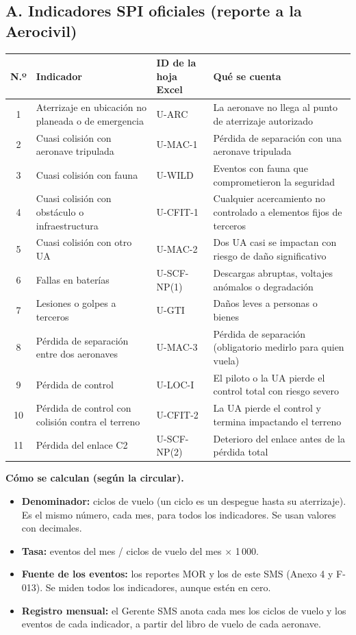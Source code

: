 \subsection*{A. Indicadores SPI oficiales (reporte a la Aerocivil)}
\begin{longtable}{|c|>{\RaggedRight\arraybackslash}p{4.4cm}|>{\RaggedRight\arraybackslash}p{2.4cm}|>{\RaggedRight\arraybackslash}p{5.6cm}|}
\hline
\rowcolor[gray]{0.9}\textbf{N.º} & \textbf{Indicador} & \textbf{ID de la hoja Excel} & \textbf{Qué se cuenta} \\ \hline
\endhead
1 & Aterrizaje en ubicación no planeada o de emergencia & U-ARC & La aeronave no llega al punto de aterrizaje autorizado \\ \hline
2 & Cuasi colisión con aeronave tripulada & U-MAC-1 & Pérdida de separación con una aeronave tripulada \\ \hline
3 & Cuasi colisión con fauna & U-WILD & Eventos con fauna que comprometieron la seguridad \\ \hline
4 & Cuasi colisión con obstáculo o infraestructura & U-CFIT-1 & Cualquier acercamiento no controlado a elementos fijos de terceros \\ \hline
5 & Cuasi colisión con otro UA & U-MAC-2 & Dos UA casi se impactan con riesgo de daño significativo \\ \hline
6 & Fallas en baterías & U-SCF-NP(1) & Descargas abruptas, voltajes anómalos o degradación \\ \hline
7 & Lesiones o golpes a terceros & U-GTI & Daños leves a personas o bienes \\ \hline
8 & Pérdida de separación entre dos aeronaves & U-MAC-3 & Pérdida de separación (obligatorio medirlo para quien vuela) \\ \hline
9 & Pérdida de control & U-LOC-I & El piloto o la UA pierde el control total con riesgo severo \\ \hline
10 & Pérdida de control con colisión contra el terreno & U-CFIT-2 & La UA pierde el control y termina impactando el terreno \\ \hline
11 & Pérdida del enlace C2 & U-SCF-NP(2) & Deterioro del enlace antes de la pérdida total \\ \hline
\end{longtable}

\textbf{Cómo se calculan (según la circular).}
\begin{itemize}
    \item \textbf{Denominador:} ciclos de vuelo (un ciclo es un despegue hasta su aterrizaje). Es el mismo número, cada mes, para todos los indicadores. Se usan valores con decimales.
    \item \textbf{Tasa:} eventos del mes / ciclos de vuelo del mes $\times$ 1\,000.
    \item \textbf{Fuente de los eventos:} los reportes MOR y los de este SMS (Anexo 4 y F-013). Se miden todos los indicadores, aunque estén en cero.
    \item \textbf{Registro mensual:} el Gerente SMS anota cada mes los ciclos de vuelo y los eventos de cada indicador, a partir del libro de vuelo de cada aeronave.
\end{itemize}

